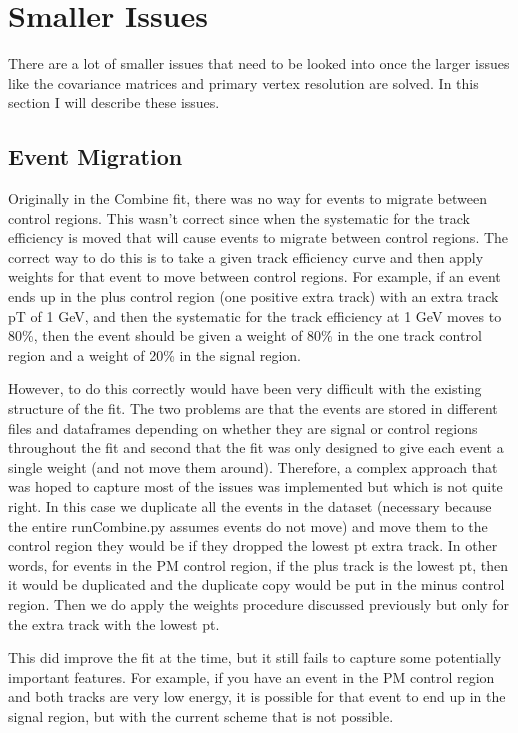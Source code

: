 \documentclass[12pt]{report}
\begin{document}
\section{Smaller Issues}
There are a lot of smaller issues that need to be looked into once the larger issues like the covariance matrices and primary vertex resolution are solved. In this section I will describe these issues.
\subsection{Event Migration}
Originally in the Combine fit, there was no way for events to migrate between
control regions. This wasn't correct since when the systematic for the track
efficiency is moved that will cause events to migrate between control regions.
The correct way to do this is to take a given track efficiency curve and then
apply weights for that event to move between control regions. For example, if
an event ends up in the plus control region (one positive extra track) with an
extra track pT of 1 GeV, and then the systematic for the track efficiency at 1
GeV moves to 80\%, then the event should be given a weight of 80\% in the one
track control region and a weight of 20\% in the signal region.

However, to do this correctly would have been very difficult with the existing
structure of the fit. The two problems are that the events are stored in
different files and dataframes depending on whether they are signal or control
regions throughout the fit and second that the fit was only designed to give
each event a single weight (and not move them around). Therefore, a complex
approach that was hoped to capture most of the issues was implemented but which
is not quite right. In this case we duplicate all the events in the dataset
(necessary because the entire runCombine.py assumes events do not move) and
move them to the control region they would be if they dropped the lowest pt
extra track. In other words, for events in the PM control region, if the plus
track is the lowest pt, then it would be duplicated and the duplicate copy
would be put in the minus control region. Then we do apply the weights
procedure discussed previously but only for the extra track with the lowest pt.

This did improve the fit at the time, but it still fails to capture some
potentially important features. For example, if you have an event in the PM
control region and both tracks are very low energy, it is possible for that
event to end up in the signal region, but with the current scheme that is not
possible.
\end{document}
